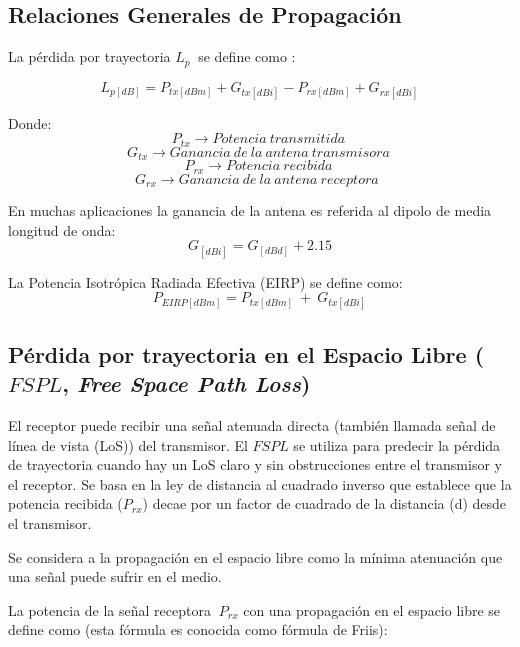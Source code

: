 \subsection{Relaciones Generales de Propagación}

La pérdida por trayectoria $L_p\ $ se define como \parencite{Correia2018}:

\begin{equation}
L_{p[dB]}=P_{tx[dBm]}+G_{tx[dBi]}-P_{rx\left[dBm\right]}+G_{rx\left[dBi\right]}
\label{eqn:Lp}
\end{equation}

Donde:
\[P_{tx}\to Potencia\ transmitida\ \] 
\[G_{tx}\to Ganancia\ de\ la\ antena\ transmisora\ \] 
\[P_{rx}\to Potencia\ recibida\ \] 
\[G_{rx}\to Ganancia\ de\ la\ antena\ receptora\ \ \] 

En muchas aplicaciones la ganancia de la antena es referida al dipolo de media longitud de onda:
\begin{equation}
G_{[dBi]} = G_{[dBd]}+{2.15} 
\label{eqn:Gain}
\end{equation}

La Potencia Isotrópica Radiada Efectiva (EIRP) se define como:
\begin{equation}
P_{EIRP[dBm]}=P_{tx\left[dBm\right]}{\ +\ G}_{tx[dBi]}
\label{eqn:EIRP}
\end{equation}

\subsection{Pérdida por trayectoria en el Espacio Libre ($FSPL$, \textit{Free Space Path Loss})}

El receptor puede recibir una señal atenuada directa (también llamada señal de línea de vista (LoS)) del transmisor. El $FSPL$ se utiliza para predecir la pérdida de trayectoria cuando hay un LoS claro y sin obstrucciones entre el transmisor y el receptor. Se basa en la ley de distancia al cuadrado inverso que establece que la potencia recibida ($P_{rx}$) decae por un factor de cuadrado de la distancia (d) desde el transmisor.\newline

Se considera a la propagación en el espacio libre como la mínima atenuación que una señal puede sufrir en el medio.\newline

La potencia de la señal receptora ${\ P}_{rx}$ con una propagación en el espacio libre se define como (esta fórmula es conocida como fórmula de Friis):\newline

